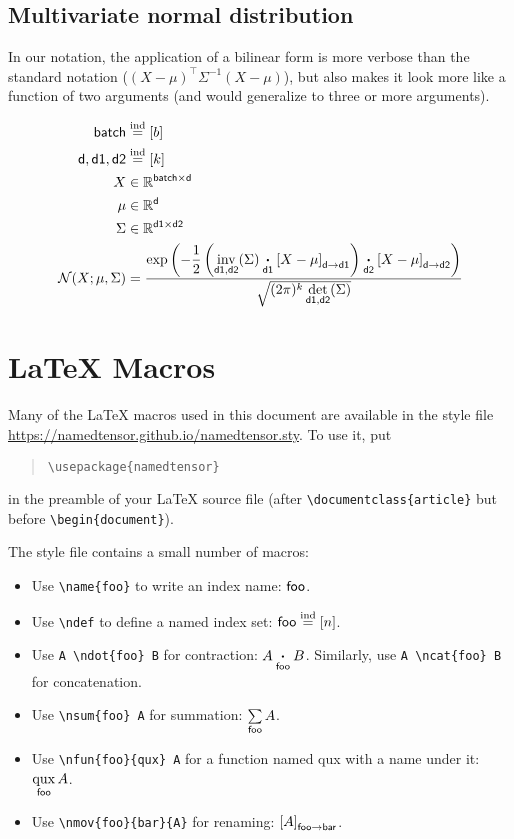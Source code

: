 \documentclass{article}
\newcommand{\reals}{\mathbb{R}}
\begin{document}
\subsection{Multivariate normal distribution}

In our notation, the application of a bilinear form is more verbose than the standard notation ($(X-\mu)^\top \Sigma^{-1} (X-\mu)$), but also makes it look more like a function of two arguments (and would generalize to three or more arguments).

\begin{align*} 
\name{batch} &\ndef [b] \\
\name{d}, \name{d1}, \name{d2} &\ndef [k] \\
X &\in \reals^{\name{batch} \times \name{d}}  \\
\mu &\in \reals^{\name{d}}  \\
\Sigma & \in   \reals^{\name{d1} \times \name{d2}}  \\
{\cal N}(X; \mu, \Sigma) &= \frac{\displaystyle \exp\left(-\frac{1}{2}  \left(\nfun{d1, d2}{inv}(\Sigma) \ndot{d1} \nmov{d}{d1}{X - \mu} \right) \ndot{d2} \nmov{d}{d2}{X - \mu} \right)}{\sqrt{(2 \pi)^k \nfun{d1, d2}{det}(\Sigma)}}
\end{align*}

\section{\LaTeX{} Macros}

Many of the \LaTeX{} macros used in this document are available in the style file \url{https://namedtensor.github.io/namedtensor.sty}. To use it, put
\begin{quote}
\begin{verbatim}
\usepackage{namedtensor}
\end{verbatim}
\end{quote}
in the preamble of your \LaTeX{} source file (after \verb|\documentclass{article}| but before \verb|\begin{document}|).

The style file contains a small number of macros:
\begin{itemize}
\item Use \verb|\name{foo}| to write an index name: $\name{foo}$.
\item Use \verb|\ndef| to define a named index set: $\name{foo} \ndef [n]$.
\item Use \verb|A \ndot{foo} B| for contraction: $A \ndot{foo} B$. Similarly, use \verb|A \ncat{foo} B| for concatenation.
\item Use \verb|\nsum{foo} A| for summation: $\nsum{foo} A$.
\item Use \verb|\nfun{foo}{qux} A| for a function named qux with a name under it: $\nfun{foo}{qux} A$.
\item Use \verb|\nmov{foo}{bar}{A}| for renaming: $\nmov{foo}{bar}{A}$.
\end{itemize}
\end{document}
